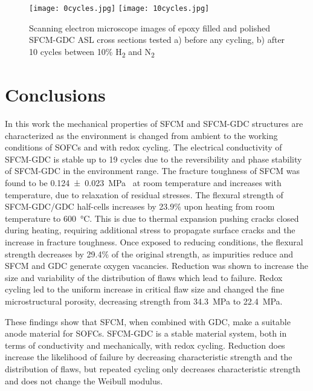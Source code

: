         \begin{figure}
          \texttt{[image: 0cycles.jpg]}
          \texttt{[image: 10cycles.jpg]}
          \caption{Scanning electron microscope images of epoxy filled and polished SFCM-GDC ASL  cross sections tested a) before any cycling, b) after 10 cycles between 10\% H\textsubscript{2} and N\textsubscript{2}}
          \label{fig:cycledSEM}
        \end{figure}

\section{Conclusions}
    In this work the mechanical properties of SFCM and SFCM-GDC structures are characterized as the environment is changed from ambient to the working conditions of SOFCs and with redox cycling.
    The electrical conductivity of SFCM-GDC is stable up to 19 cycles due to the reversibility and phase stability of SFCM-GDC in the environment range.
    The fracture toughness of SFCM was found to be \SI[separate-uncertainty = true]{0.124 +- 0.023}{\mega\pascal{}} at room temperature and increases with temperature, due to relaxation of residual stresses.
    The flexural strength of SFCM-GDC/GDC half-cells increases by 23.9\% upon heating from room temperature to \SI{600}{\celsius}.
    This is due to thermal expansion pushing cracks closed during heating, requiring additional stress to propagate surface cracks and the increase in fracture toughness.
    Once exposed to reducing conditions, the flexural strength decreases by 29.4\% of the original strength, as impurities reduce and SFCM and GDC generate oxygen vacancies.
    Reduction was shown to increase the size and variability of the distribution of flaws which lead to failure.
    Redox cycling led to the uniform increase in critical flaw size and changed the fine microstructural porosity, decreasing strength from \SI{34.3}{\mega\pascal} to \SI{22.4}{\mega\pascal}.

    These findings show that SFCM, when combined with GDC, make a suitable anode material for SOFCs.
    SFCM-GDC is a stable material system, both in terms of conductivity and mechanically, with redox cycling.
    Reduction does increase the likelihood of failure by decreasing characteristic strength and the distribution of flaws, but repeated cycling only decreases characteristic strength and does not change the Weibull modulus.
